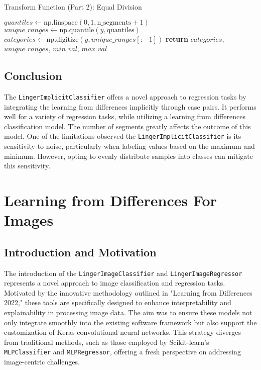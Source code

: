 \documentclass[a4paper, 12pt]{report}
\begin{document}
\begin{algorithm}
    \caption{Transform Function (Part 2): Equal Division}
    \begin{algorithmic}[1]
            \State $quantiles \gets \text{np.linspace}(0, 1, \text{n\_segments} + 1)$
                \State $unique\_ranges \gets \text{np.quantile}(y, \text{quantiles})$
            \EndIf
            \State $categories \gets \text{np.digitize}(y, unique\_ranges[:-1])$
            \State \textbf{return} $categories$, $unique\_ranges$, $min\_val$, $max\_val$
    \EndFunction
    \end{algorithmic}
\end{algorithm}
\clearpage

\subsection{Conclusion}
The \texttt{LingerImplicitClassifier} offers a novel approach to regression tasks by integrating the learning from differences implicitly through case pairs. 
It performs well for a variety of regression tasks, while utilizing a learning from differences classification model. The number of segments greatly affects the outcome of this model.
One of the limitations observed the \texttt{LingerImplicitClassifier} is its sensitivity to noise, particularly when labeling values based on the maximum and minimum. 
However, opting to evenly distribute samples into classes can mitigate this sensitivity. 

\section{Learning from Differences For Images}
\label{sec:lingerImage_models}
\subsection{Introduction and Motivation}
The introduction of the \texttt{LingerImageClassifier} and \texttt{LingerImageRegressor} represents a novel approach 
to image classification and regression tasks. Motivated by the innovative methodology outlined in "Learning from Differences 2022," 
these tools are specifically designed to enhance interpretability and explainability in processing image data. 
The aim was to ensure these models not only integrate smoothly into the existing software framework but also support the customization of Keras 
convolutional neural networks. This strategy diverges from traditional methods, such as those employed by Scikit-learn's \texttt{MLPClassifier} and 
\texttt{MLPRegressor}, offering a fresh perspective on addressing image-centric challenges.
\end{document}
